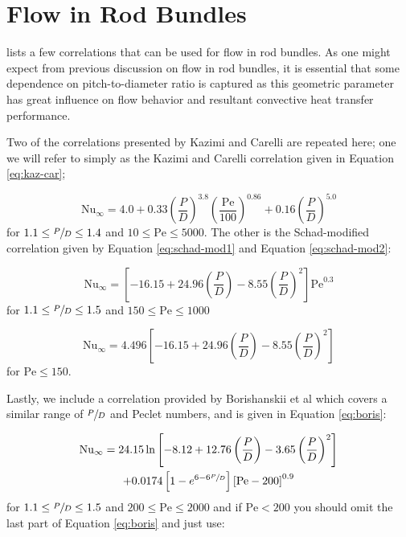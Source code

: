 \section{Flow in Rod Bundles}
 lists a few correlations that can be used for flow in rod bundles.  As one might expect from previous discussion on flow in rod bundles, it is essential that some dependence on pitch-to-diameter ratio is captured as this geometric parameter has great influence on flow behavior and resultant convective heat transfer performance.

Two of the correlations presented by Kazimi and Carelli are repeated here\cite{kazami1976heat}; one we will refer to simply as the Kazimi and Carelli correlation given in Equation \ref{eq:kaz-car}; 

\begin{equation}
\text{Nu}_{\infty} = 4.0 + 0.33\left(\frac{P}{D}\right)^{3.8}\left(\frac{\text{Pe}}{100} \right)^{0.86} + 0.16 \left(\frac{P}{D}\right)^{5.0}
\label{eq:kaz-car}
\end{equation}
for $1.1 \le \sfrac{P}{D} \le 1.4$ and $10 \le \text{Pe} \le 5000$.
The other is the Schad-modified correlation given by Equation \ref{eq:schad-mod1} and Equation \ref{eq:schad-mod2}: 

\begin{equation}
\text{Nu}_{\infty} = \left[-16.15 + 24.96 \left(\frac{P}{D} \right) - 8.55 \left(\frac{P}{D} \right)^2 \right]\text{Pe}^{0.3}
\label{eq:schad-mod1}
\end{equation}
for $1.1 \le \sfrac{P}{D} \le 1.5$ and $150 \le \text{Pe} \le 1000$

\begin{equation}
\text{Nu}_{\infty} = 4.496\left[-16.15 + 24.96 \left(\frac{P}{D} \right) - 8.55 \left(\frac{P}{D} \right)^2 \right]
\label{eq:schad-mod2}
\end{equation}
for $\text{Pe} \le 150$.

Lastly, we include a correlation provided by Borishanskii et al \cite{borishanskii1969heat} which covers a similar range of $\sfrac{P}{D}$ and Peclet numbers, and is given in Equation \ref{eq:boris}: 

\begin{multline}
\text{Nu}_{\infty} = 24.15 \ln{\left[-8.12 + 12.76\left(\frac{P}{D}\right)-3.65 \left(\frac{P}{D} \right)^2  \right]} \\ + 0.0174\left[1 - e^{6 - 6\sfrac{P}{D}} \right] \left[\text{Pe} - 200 \right]^{0.9}
\label{eq:boris}
\end{multline}
for $1.1 \le \sfrac{P}{D} \le 1.5$ and $200 \le \text{Pe} \le 2000$ and if $\text{Pe}< 200$ you should omit the last part of Equation \ref{eq:boris} and just use:

